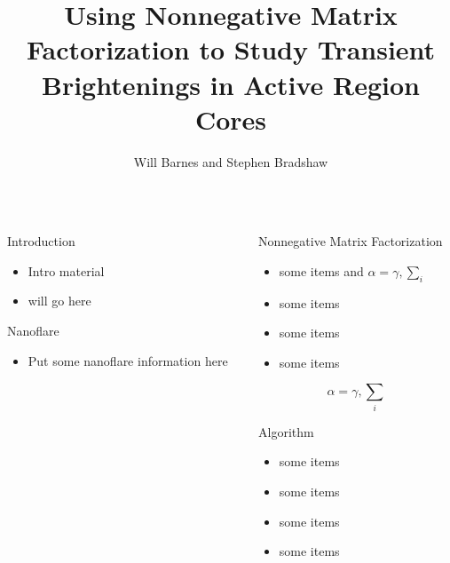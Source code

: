\documentclass[final]{beamer}
\title[NMF in Active Regions]{Using Nonnegative Matrix Factorization to Study Transient Brightenings in Active Region Cores}
\author[Barnes \& Bradshaw]{Will Barnes and Stephen Bradshaw}
\institute[Rice University]{Department of Physics and Astronomy, Rice University}
\begin{document}
\begin{frame}{} 
    \begin{columns}[t]
		\hfill
      \begin{column}{.32\linewidth}
        \begin{block}{Introduction}

          \begin{itemize}
			  \item Intro material
			  \item will go here
    
          \end{itemize}
        \end{block}
		\begin{block}{Nanoflare}
			\begin{itemize}
				\item Put some nanoflare information here
			\end{itemize}
		\end{block}
		
      \end{column}
      \begin{column}{.32\linewidth}
        \begin{block}{Nonnegative Matrix Factorization}
          \begin{itemize}
          \item some items and $\alpha=\gamma, \sum_{i}$
          \item some items
          \item some items
          \item some items
          \end{itemize}
          $$\alpha=\gamma, \sum_{i}$$
        \end{block}

        \begin{block}{Algorithm}
          \begin{itemize}
          \item some items
          \item some items
          \item some items
          \item some items
          \end{itemize}
        \end{block}


\end{column}
\end{columns}
\end{frame}
\end{document}
